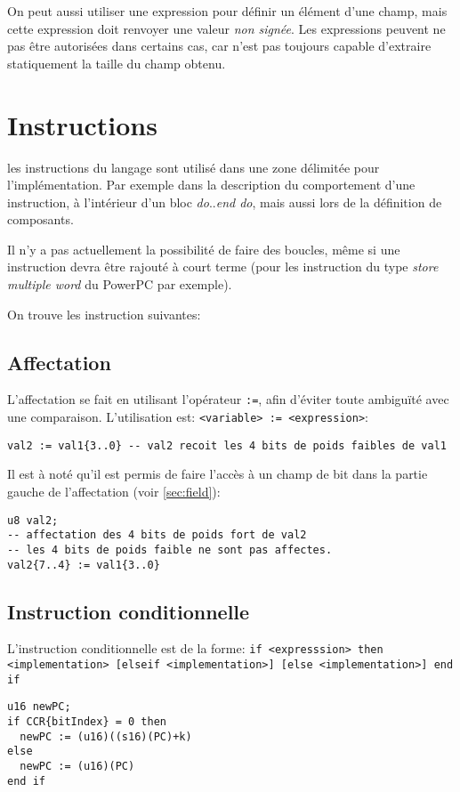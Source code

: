 On peut aussi utiliser une expression pour définir un élément d'une champ, mais
cette expression doit renvoyer une valeur \emph{non signée}. Les expressions
peuvent ne pas être autorisées dans certains cas, car \harmless{} n'est pas toujours capable d'extraire statiquement la taille du champ obtenu.

\section{Instructions}
les instructions du langage sont utilisé dans une zone délimitée pour l'implémentation. Par exemple dans la description du comportement d'une instruction, à l'intérieur d'un bloc \emph{do}..\emph{end do}, mais aussi lors de la définition de composants.

Il n'y a pas actuellement la possibilité de faire des boucles, même si une instruction devra être rajouté à court terme (pour les instruction du type \emph{store multiple word} du PowerPC par exemple).

On trouve les instruction suivantes:

\subsection{Affectation}
L'affectation se fait en utilisant l'opérateur \texttt{:=}, afin d'éviter toute ambiguïté avec une comparaison.
L'utilisation est: \texttt{<variable> :=  <expression>}:
\begin{lstlisting}
val2 := val1{3..0} -- val2 recoit les 4 bits de poids faibles de val1
\end{lstlisting}

Il est à noté qu'il est permis de faire l'accès à un champ de bit dans la partie gauche de l'affectation (voir \ref{sec:field}):
\begin{lstlisting}
u8 val2;
-- affectation des 4 bits de poids fort de val2
-- les 4 bits de poids faible ne sont pas affectes.
val2{7..4} := val1{3..0} 
\end{lstlisting}

\subsection{Instruction conditionnelle}
L'instruction conditionnelle est de la forme: \texttt{if <expresssion> then <implementation> [elseif <implementation>] [else <implementation>] end if}
\begin{lstlisting}
u16 newPC;
if CCR{bitIndex} = 0 then 
  newPC := (u16)((s16)(PC)+k) 
else 
  newPC := (u16)(PC)
end if 
\end{lstlisting}

